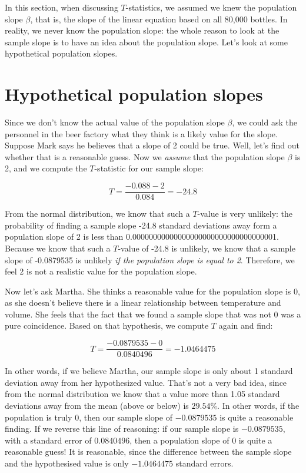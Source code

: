 \documentclass[]{report}\usepackage[]{graphicx}\usepackage[]{color}
\begin{document}
In this section, when discussing $T$-statistics, we assumed we knew the population slope $\beta$, that is, the slope of the linear equation based on all 80,000 bottles. In reality, we never know the population slope: the whole reason to look at the sample slope is to have an idea about the population slope. Let's look at some hypothetical population slopes.





\section{Hypothetical population slopes}


Since we don't know the actual value of the population slope $\beta$, we could ask the personnel in the beer factory what they think is a likely value for the slope. Suppose Mark says he believes that a slope of 2 could be true. Well, let's find out whether that is a reasonable guess. Now we \textit{assume} that the population slope $\beta$ is 2, and we compute the $T$-statistic for our sample slope:



\begin{equation}
T = \frac{-0.088-2}{0.084}= -24.8
\end{equation}

From the normal distribution, we know that such a $T$-value is very unlikely: the probability of finding a sample slope -24.8 standard deviations away form a population slope of 2 is less than 0.00000000000000000000000000000000001. Because we know that such a $T$-value of -24.8 is unlikely, we know that a sample slope of -0.0879535 is unlikely \textit{if the population slope is equal to 2}. Therefore, we feel 2 is not a realistic value for the population slope.


Now let's ask Martha. She thinks a reasonable value for the population slope is 0, as she doesn't believe there is a linear relationship between temperature and volume. She feels that the fact that we found a sample slope that was not 0 was a pure coincidence. Based on that hypothesis, we compute $T$ again and find:


\begin{equation}
T = \frac{-0.0879535-0}{0.0840496}= -1.0464475
\end{equation}

In other words, if we believe Martha, our sample slope is only about 1 standard deviation away from her hypothesized value. That's not a very bad idea, since from the normal distribution we know that a value more than 1.05 standard deviations away from the mean (above or below) is $29.54$\%. In other words, if the population is truly 0, then our sample slope of $-0.0879535$ is quite a reasonable finding. If we reverse this line of reasoning: if our sample slope is $-0.0879535$, with a standard error of $0.0840496$, then a population slope of 0 is quite a reasonable guess! It is reasonable, since the difference between the sample slope and the hypothesised value is only $-1.0464475$ standard errors.
\end{document}

